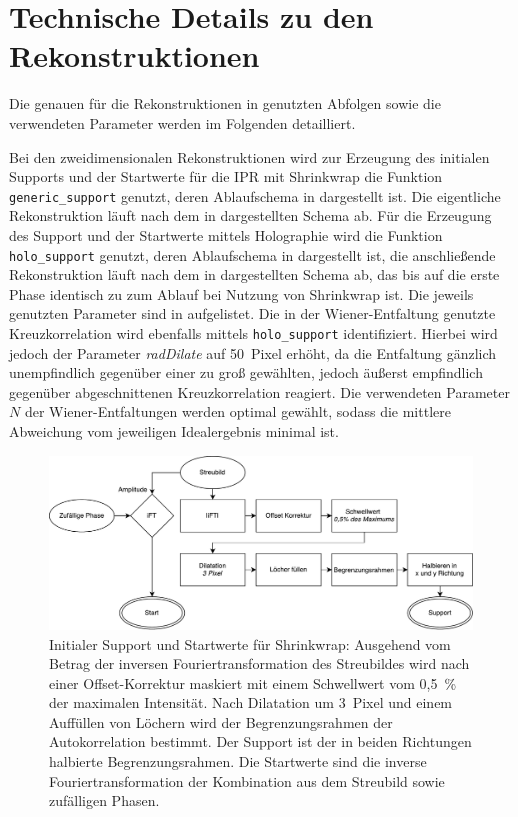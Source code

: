 \chapter[Technische Details zu den Rekonstruktionen]{Technische Details zu den\\ Rekonstruktionen}
\label{app:param}
Die genauen für die Rekonstruktionen in  genutzten Abfolgen sowie die verwendeten Parameter werden im Folgenden detailliert.

Bei den zweidimensionalen Rekonstruktionen wird zur Erzeugung des initialen Supports und der Startwerte für die IPR mit Shrinkwrap die Funktion \texttt{generic\_support} genutzt, deren Ablaufschema in  dargestellt ist. Die eigentliche Rekonstruktion läuft nach dem in  dargestellten Schema ab.
Für die Erzeugung des Support und der Startwerte mittels Holographie wird die Funktion \texttt{holo\_support} genutzt, deren Ablaufschema in  dargestellt ist, die anschließende Rekonstruktion läuft nach dem in  dargestellten Schema ab, das bis auf die erste Phase identisch zu zum Ablauf bei Nutzung von Shrinkwrap ist.
Die jeweils genutzten Parameter sind in  aufgelistet.
Die in der Wiener-Entfaltung genutzte Kreuzkorrelation wird ebenfalls mittels \texttt{holo\_support} identifiziert. Hierbei wird jedoch der Parameter \textit{radDilate} auf \SI{50}{Pixel} erhöht, da die Entfaltung gänzlich unempfindlich gegenüber einer zu groß gewählten, jedoch äußerst empfindlich gegenüber abgeschnittenen Kreuzkorrelation reagiert. Die verwendeten Parameter $N$ der Wiener-Entfaltungen werden optimal gewählt, sodass die mittlere Abweichung vom jeweiligen Idealergebnis minimal ist.

\begin{figure}
	\centering
	\includegraphics[width=.85\textwidth]{images/flow_genericsupport.pdf}
	\caption[Initialer Support für Shrinkwrap]{Initialer Support und Startwerte für Shrinkwrap: Ausgehend vom Betrag der inversen Fouriertransformation des Streubildes wird nach einer Offset-Korrektur maskiert mit einem Schwellwert vom 0,5~\% der maximalen Intensität. Nach Dilatation um \SI{3}{Pixel} und einem Auffüllen von Löchern wird der Begrenzungsrahmen der Autokorrelation bestimmt. Der Support ist der in beiden Richtungen halbierte Begrenzungsrahmen. Die Startwerte sind die inverse Fouriertransformation der Kombination aus dem Streubild sowie zufälligen Phasen.}
	\label{fig:flow_genericsupport}
\end{figure} 

